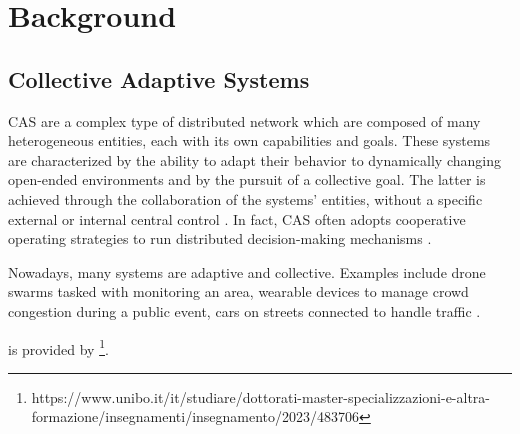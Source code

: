 \documentclass[12pt,a4paper,openright,twoside]{book}
\begin{document}
\chapter{Background}

\section{Collective Adaptive Systems}

\ac{CAS} are a complex type of distributed network which are composed of many heterogeneous entities, each with its own capabilities and goals. 
These systems are characterized by the ability to adapt their behavior to dynamically changing open-ended environments and by the pursuit of a collective goal. 
The latter is achieved through the collaboration of the systems’ entities, without a specific external or internal central control \cite{DBLP:series/lncs/HolzlRW08, DBLP:journals/corr/abs-1108-5643}. 
In fact, CAS often adopts cooperative operating strategies to run distributed decision-making mechanisms \cite{DBLP:journals/tomacs/Aldini18}.

Nowadays, many systems are adaptive and collective. Examples include drone swarms tasked with monitoring an area,
wearable devices to manage crowd congestion during a public event, cars on streets connected to handle traffic \cite{DBLP:journals/sttt/NicolaJW20}.

 is provided by \footnote{https://www.unibo.it/it/studiare/dottorati-master-specializzazioni-e-altra-formazione/insegnamenti/insegnamento/2023/483706}.
\end{document}

